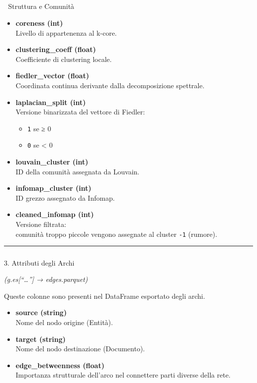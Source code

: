\documentclass[
  italian,
  a4paper,
]{article}
\makeatletter
\let\oldsubparagraph\subparagraph
\renewcommand{\subparagraph}{
    \@ifstar
      \xxxSubParagraphStar
      \xxxSubParagraphNoStar
  }
\newcommand{\xxxSubParagraphStar}[1]{\oldsubparagraph*{#1}\mbox{}}
\newcommand{\xxxSubParagraphNoStar}[1]{\oldsubparagraph{#1}\mbox{}}
\providecommand{\tightlist}{%
  \setlength{\itemsep}{0pt}\setlength{\parskip}{0pt}}
\makeatother
\begin{document}
\subparagraph{🔹 Struttura e Comunità}\label{struttura-e-comunituxe0}

\begin{itemize}
\item
  \textbf{coreness (int)}\\
  Livello di appartenenza al k-core.
\item
  \textbf{clustering\_coeff (float)}\\
  Coefficiente di clustering locale.
\item
  \textbf{fiedler\_vector (float)}\\
  Coordinata continua derivante dalla decomposizione spettrale.
\item
  \textbf{laplacian\_split (int)}\\
  Versione binarizzata del vettore di Fiedler:

  \begin{itemize}
  \tightlist
  \item
    \texttt{1} se ≥ 0\\
  \item
    \texttt{0} se \textless{} 0
  \end{itemize}
\item
  \textbf{louvain\_cluster (int)}\\
  ID della comunità assegnata da Louvain.
\item
  \textbf{infomap\_cluster (int)}\\
  ID grezzo assegnato da Infomap.
\item
  \textbf{cleaned\_infomap (int)}\\
  Versione filtrata:\\
  comunità troppo piccole vengono assegnate al cluster \texttt{-1}
  (rumore).
\end{itemize}

\begin{center}\rule{0.5\linewidth}{0.5pt}\end{center}

\subparagraph{3. Attributi degli Archi}\label{attributi-degli-archi}

\emph{(g.es{[}``\ldots{}''{]} → edges.parquet)}

Queste colonne sono presenti nel DataFrame esportato degli archi.

\begin{itemize}
\item
  \textbf{source (string)}\\
  Nome del nodo origine (Entità).
\item
  \textbf{target (string)}\\
  Nome del nodo destinazione (Documento).
\item
  \textbf{edge\_betweenness (float)}\\
  Importanza strutturale dell'arco nel connettere parti diverse della
  rete.
\end{itemize}
\end{document}
